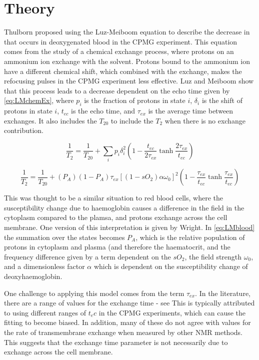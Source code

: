 \section{Theory}
Thulborn proposed using the Luz-Meiboom equation to describe the decrease in \Ttwo that occurs in deoxygenated blood in the CPMG experiment.
This equation comes from the study of a chemical exchange process, where protons on an ammonium ion exchange with the solvent\cite{LuzNuclearMagneticResonance1963}.
Protons bound to the ammonium ion have a different chemical shift, which combined with the exchange, makes the refocusing pulses in the CPMG experiment less effective.
Luz and Meiboom show that this process leads to a \Ttwo decrease dependent on the echo time given by \autoref{eq:LMchemEx}\cite{LuzNuclearMagneticResonance1963}, where $p_i$ is the fraction of protons in state $i$, $\delta_i$ is the shift of protons in state $i$, $t_{ec}$ is the echo time, and $\tau_{ex}$ is the average time between exchanges. It also includes the $T_{20}$ to include the $T_2$ when there is no exchange contribution.

\begin{equation}
\label{eq:LMchemEx}
\frac{1}{T_2} = \frac{1}{T_{20}} + \sum_i{p_i\delta_i^2} (1 - \frac{t_{ec}}{2\tau_{ex}} \tanh{\frac{2\tau_{ex}}{t_{ec}}})
\end{equation}

\begin{equation}
\label{eq:LMblood}
\frac{1}{T_2} = \frac{1}{T_{20}} +(P_A)(1 - P_A)\tau_{ex} [(1-sO_2)\alpha\omega_0]^2 (1 - \frac{\tau_{ex}}{t_{ec}} \tanh{\frac{\tau_{ex}}{t_{ec}}})
\end{equation}

This was thought to be a similar situation to red blood cells, where the susceptibility change due to haemoglobin causes a difference in the field in the cytoplasm compared to the plamsa, and protons exchange across the cell membrane.
One version of this interpretation is given by Wright\cite{WrightEstimatingoxygensaturation1991}. In \autoref{eq:LMblood} the summation over the states becomes $P_A$, which is the relative population of protons in cytoplasm and plasma (and therefore the haematocrit, and the frequency difference given by a term dependent on the $sO_2$, the field strength $\omega_0$, and a dimensionless factor $\alpha$ which is dependent on the susceptibility change of deoxyhaemoglobin.

One challenge to applying this model comes from the term $\tau_{ex}$.
In the literature, there are a range of values for the exchange time - see %
This is typically attributed to using different ranges of $t_ec$ in the CPMG experiments, which can cause the fitting to become biased.
In addition, many of these do not agree with values for the rate of transmembrane exchange when measured by other NMR methods.
This suggests that the exchange time parameter is not necessarily due to exchange across the cell membrane.

